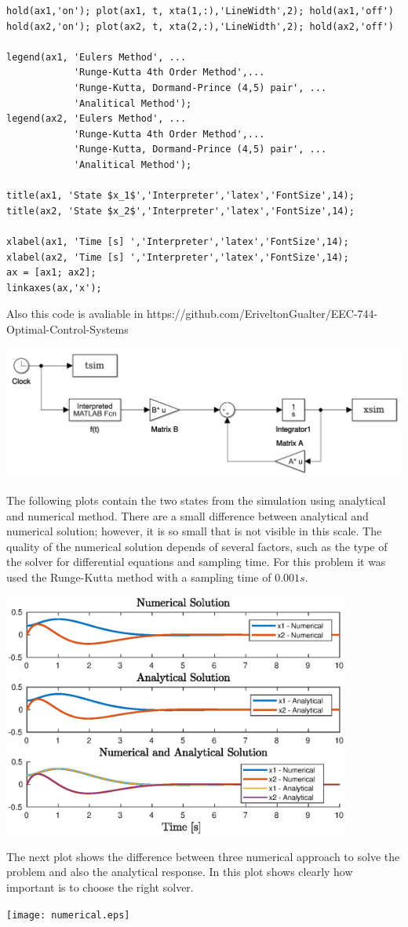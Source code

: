 \documentclass{article}
\begin{document}
\begin{lstlisting}
hold(ax1,'on'); plot(ax1, t, xta(1,:),'LineWidth',2); hold(ax1,'off')
hold(ax2,'on'); plot(ax2, t, xta(2,:),'LineWidth',2); hold(ax2,'off')
    
legend(ax1, 'Eulers Method', ...
            'Runge-Kutta 4th Order Method',...
            'Runge-Kutta, Dormand-Prince (4,5) pair', ...
            'Analitical Method');
legend(ax2, 'Eulers Method', ...
            'Runge-Kutta 4th Order Method',...
            'Runge-Kutta, Dormand-Prince (4,5) pair', ...
            'Analitical Method');
        
title(ax1, 'State $x_1$','Interpreter','latex','FontSize',14); 
title(ax2, 'State $x_2$','Interpreter','latex','FontSize',14); 

xlabel(ax1, 'Time [s] ','Interpreter','latex','FontSize',14); 
xlabel(ax2, 'Time [s] ','Interpreter','latex','FontSize',14); 
ax = [ax1; ax2];
linkaxes(ax,'x');
\end{lstlisting}

Also this code is avaliable in https://github.com/EriveltonGualter/EEC-744-Optimal-Control-Systems

\begin{center}
\includegraphics[width=\textwidth]{sim.png}
\end{center}
The following plots contain the two states from the simulation using analytical and numerical method. There are a small difference between analytical and numerical solution; however, it is so small that is not visible in this scale. 
The quality of the numerical solution depends of several factors, such as the type of the solver for differential equations and sampling time. For this problem it was used the Runge-Kutta method with a sampling time of $0.001s$.

\begin{center}
\includegraphics [width=4.5in]{plot.eps}
\end{center}

The next plot shows the difference between three numerical approach to solve the problem and also the analytical response. In this plot shows clearly how important is to choose the right solver.

\texttt{[image: numerical.eps]}
\end{document}
